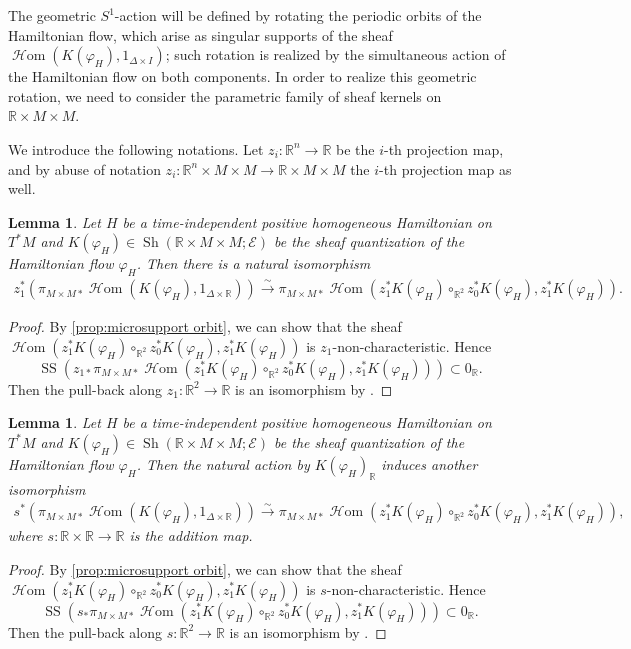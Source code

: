 \documentclass[11pt]{amsart}
\numberwithin{equation}{section}
\theoremstyle{plain}
\newtheorem{Lemma}[lemma]{Lemma}
\theoremstyle{definition}
\theoremstyle{remark}
\newcommand{\bR} { {\mathbb{R}}}
\newcommand{\cE} { {\mathcal{E}}}
\newcommand{\Sh} { {\operatorname{Sh}}}
\newcommand\ms{\operatorname{SS}}
\newcommand\sHom{\operatorname{\mathscr{H}om}}
\begin{document}
The geometric $S^1$-action will be defined by rotating the periodic orbits of the Hamiltonian flow, which arise as singular supports of the sheaf $\sHom(K(\varphi_H), 1_{\Delta \times I})$; such rotation is realized by the simultaneous action of the Hamiltonian flow on both components. In order to realize this geometric rotation, we need to consider the parametric family of sheaf kernels on $\bR \times M \times M$.

We introduce the following notations. Let $z_i: \bR^n \to \bR$ be the $i$-th projection map, and by abuse of notation $z_i: \bR^n \times M \times M \to \bR \times M \times M$ the $i$-th projection map as well.

\begin{Lemma}\label{lem: projection map}
Let $H$ be a time-independent positive homogeneous Hamiltonian on $T^*M$ and $K(\varphi_H) \in \Sh(\bR \times M \times M; \cE)$ be the sheaf quantization of the Hamiltonian flow $\varphi_H$. Then there is a natural isomorphism
\begin{align*}
z_1^*(\pi_{M\times M*}\sHom(K(\varphi_H), 1_{\Delta\times \bR})) \xrightarrow{\sim} \pi_{M\times M*}\sHom(z_1^*K(\varphi_H) \circ_{\bR^2} z_0^*K(\varphi_H), z_1^*K(\varphi_H)).
\end{align*}
\end{Lemma}
\begin{proof}
By \autoref{prop:microsupport orbit}, we can show that the sheaf $\sHom(z_1^*K(\varphi_H) \circ_{\bR^2} z_0^*K(\varphi_H), z_1^*K(\varphi_H))$ is $z_1$-non-characteristic. Hence
\[{\ms}(z_{1*}\pi_{M\times M*}\sHom(z_1^*K(\varphi_H) \circ_{\bR^2} z_0^*K(\varphi_H), z_1^*K(\varphi_H))) \subset 0_{\bR}.\]
Then the pull-back along $z_1: \bR^2 \rightarrow \bR$ is an isomorphism by \cite[Corollary 2.7.7]{KS90}.
\end{proof}

\begin{Lemma}\label{lem: action map}
Let $H$ be a time-independent positive homogeneous Hamiltonian on $T^*M$ and $K(\varphi_H) \in \Sh(\bR \times M \times M; \cE)$ be the sheaf quantization of the Hamiltonian flow $\varphi_H$. Then the natural action by $K(\varphi_H)_\bR$ induces another isomorphism
\begin{gather*}
s^*( \pi_{M\times M*}\sHom(K(\varphi_H), 1_{\Delta\times \bR})) \xrightarrow{\sim} \pi_{M\times M*}\sHom(z_1^*K(\varphi_H) \circ_{\bR^2} z_0^*K(\varphi_H), z_1^*K(\varphi_H)),
\end{gather*}
where $s: \bR \times \bR \to \bR$ is the addition map.
\end{Lemma}
\begin{proof}
By \autoref{prop:microsupport orbit}, we can show that the sheaf $\sHom(z_1^*K(\varphi_H) \circ_{\bR^2} z_0^*K(\varphi_H), z_1^*K(\varphi_H))$ is $s$-non-characteristic. Hence
\[{\ms}(s_{*}\pi_{M\times M*}\sHom(z_1^*K(\varphi_H) \circ_{\bR^2} z_0^*K(\varphi_H), z_1^*K(\varphi_H))) \subset 0_{\bR}.\]
Then the pull-back along $s: \bR^2 \rightarrow \bR$ is an isomorphism by \cite[Corollary 2.7.7]{KS90}.
\end{proof}
\end{document}
